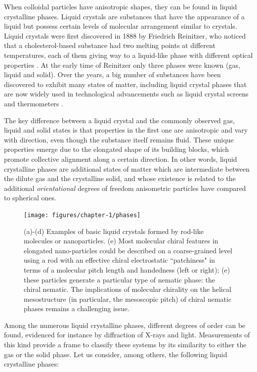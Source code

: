 When colloidal particles have anisotropic shapes, they can be found in liquid crystalline phases. Liquid crystals are substances that have the appearance of a liquid but possess certain levels of molecular arrangement similar to crystals. Liquid crystals were first discovered in 1888 by Friedrich Reinitzer, who noticed that a cholesterol-based substance had two melting points at different temperatures, each of them giving way to a liquid-like phase with different optical properties \cite{reinitzer1888beitrage}. At the early time of Reinitzer only three phases were known (gas, liquid and solid). Over the years, a big number of substances have been discovered to exhibit many states of matter, including liquid crystal phases that are now widely used in technological advancements such as liquid crystal screens and thermometers \cite{Li_2012}.

The key difference between a liquid crystal and the commonly observed gas, liquid and solid states is that properties in the first one are anisotropic and vary with direction, even though the substance itself remains fluid. These unique properties emerge due to the elongated shape of its building blocks, which promote collective alignment along a certain direction. In other words, liquid crystalline phases are additional states of matter which are intermediate between the dilute gas and the crystalline solid, and whose existence is related to the additional {\em orientational} degrees of freedom anisometric particles have compared to spherical ones.

\begin{figure}
\begin{center}
\texttt{[image: figures/chapter-1/phases]}
\caption{ \label{introfig1} (a)-(d) Examples of basic liquid crystals formed by rod-like molecules or nanoparticles. (e) Most molecular chiral features in elongated nano-particles  could be described on a coarse-grained level using a rod with an effective chiral electrostatic ``patchiness"  in terms of a molecular pitch length and handedness (left or right); (e) these particles generate a particular type of nematic phase: the chiral nematic. The implications of molecular chirality on the helical mesostructure (in particular, the mesoscopic pitch) of chiral nematic phases remains a challenging issue.}
\end{center}
\end{figure}

Among the numerous liquid crystalline phases, different degrees of order can be found, evidenced for instance by diffraction of X-rays and light. Measurements of this kind provide a frame to classify these systems by its similarity to either the gas or the solid phase. Let us consider, among others, the following liquid crystalline phases:

